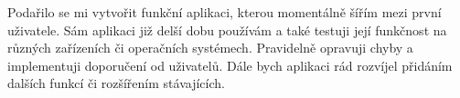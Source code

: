 
Podařilo se mi vytvořit funkční aplikaci, kterou momentálně šířím mezi první uživatele.
Sám aplikaci již delší dobu používám a také testuji její funkčnost na různých zařízeních či operačních systémech.
Pravidelně opravuji chyby a implementuji doporučení od uživatelů.
Dále bych aplikaci rád rozvíjel přidáním dalších funkcí či rozšířením stávajících.

